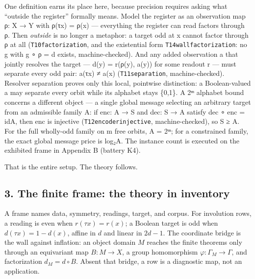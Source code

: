 \documentclass[10pt]{article}
\renewcommand{\_}{\origunderscore\allowbreak}
\begin{document}
One definition earns its place here, because precision requires asking
what ``outside the register'' formally means. Model the register as an
observation map ρ: X → Y with ρ(τx) = ρ(x) --- everything the register
can read factors through ρ. Then \emph{outside} is no longer a metaphor:
a target odd at x cannot factor through ρ at all
(\texttt{T10\_factorization}, and the existential form
\texttt{T14\_wall\_factorization}: no g with g ∘ ρ = d exists,
machine-checked). And any added observation a that jointly resolves the
target --- d(y) = r(ρ(y), a(y)) for some readout r --- must separate
every odd pair: a(τx) ≠ a(x) (\texttt{T11\_separation},
machine-checked). Resolver separation proves only this local, pointwise
distinction: a Boolean-valued a may separate every orbit while its
alphabet stays \{0,1\}. A 2ᵐ alphabet bound concerns a different object
--- a single global message selecting an arbitrary target from an
admissible family A: if enc: A → S and dec: S → A satisfy dec ∘ enc =
id\_A, then enc is injective (\texttt{T12\_encoder\_injective},
machine-checked), so \textbar S\textbar{} ≥ \textbar A\textbar. For the
full wholly-odd family on m free orbits, \textbar A\textbar{} = 2ᵐ; for
a constrained family, the exact global message price is
log₂\textbar A\textbar. The instance count is executed on the exhibited
frame in Appendix B (battery K4).

That is the entire setup. The theory follows.

\hypertarget{the-finite-frame-the-theory-in-inventory}{%
\subsection{3. The finite frame: the theory in
inventory}\label{the-finite-frame-the-theory-in-inventory}}

A frame names data, symmetry, readings, target, and corpus. For
involution rows, a reading is even when \(r(\tau x)=r(x)\); a Boolean
target is odd when \(d(\tau x)=1-d(x)\), affine in \(d\) and linear in
\(2d-1\). The coordinate bridge is the wall against inflation: an object
domain \(M\) reaches the finite theorems only through an equivariant map
\(B:M\to X\), a group homomorphism \(\varphi:\Gamma_M\to\Gamma\), and
factorization \(d_M=d\circ B\). Absent that bridge, a row is a
diagnostic map, not an application.
\end{document}

